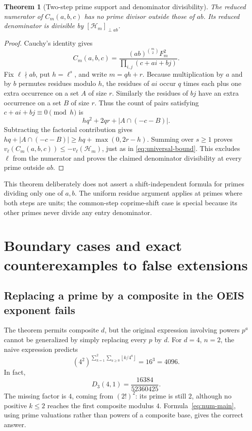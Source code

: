 \documentclass[11pt,a4paper]{article}
\newtheorem{theorem}{Theorem}[section]
\theoremstyle{definition}
\theoremstyle{remark}
\newcommand{\sfac}{F}
\newcommand{\HH}{\mathcal H}
\newcommand{\floor}[1]{\left\lfloor #1\right\rfloor}
\newcommand{\freepart}[2]{\left[#1\right]_{\perp #2}}
\begin{document}
\begin{theorem}[Two-step prime support and denominator divisibility]
\label{thm:two-step}
The reduced numerator of $C_m(a,b,c)$ has no prime divisor outside those
of $ab$. Its reduced denominator is divisible by
$\freepart{\HH_m}{ab}$.
\end{theorem}
\begin{proof}
Cauchy's identity gives
\[
 C_m(a,b,c)
 =\frac{(ab)^{\binom m2}\sfac_m^2}
 {\prod_{i,j}(c+ai+bj)}.
\]
Fix $\ell\nmid ab$, put $h=\ell^s$, and write $m=qh+r$.
Because multiplication by $a$ and by $b$ permutes residues modulo $h$,
the residues of $ai$ occur $q$ times each plus one extra occurrence on a
set $A$ of size $r$. Similarly the residues of $bj$ have an extra occurrence
on a set $B$ of size $r$. Thus the count of pairs satisfying
$c+ai+bj\equiv0\pmod h$ is
\[
 hq^2+2qr+|A\cap(-c-B)|.
\]
Subtracting the factorial contribution gives
$hq+|A\cap(-c-B)|\ge hq+\max(0,2r-h)$.
Summing over $s\ge1$ proves
$v_\ell(C_m(a,b,c))\le-v_\ell(\HH_m)$, just as in
\eqref{eq:universal-bound}. This excludes $\ell$ from the numerator and
proves the claimed denominator divisibility at every prime outside $ab$.
\end{proof}

This theorem deliberately does not assert a shift-independent formula for
primes dividing only one of $a,b$. The uniform residue argument applies at
primes where both steps are units; the common-step coprime-shift case is
special because its other primes never divide any entry denominator.

\section{Boundary cases and exact counterexamples to false extensions}
\label{sec:boundaries}

\subsection{Replacing a prime by a composite in the OEIS exponent fails}
The theorem permits composite $d$, but the original expression involving
powers $p^a$ cannot be generalized by simply replacing every $p$ by $d$.
For $d=4$, $n=2$, the naive expression predicts
\[
 (4^2)^{\sum_{k=1}^2\sum_{a\ge0}\floor{k/4^a}}
 =16^3=4096.
\]
In fact,
\[
 D_3(4,1)=\frac{16384}{52360425}.
\]
The missing factor is $4$, coming from $(2!)^2$: its prime is still $2$,
although no positive $k\le2$ reaches the first composite modulus $4$.
Formula~\eqref{eq:num-main}, using prime valuations rather than powers of a
composite base, gives the correct answer.
\end{document}
